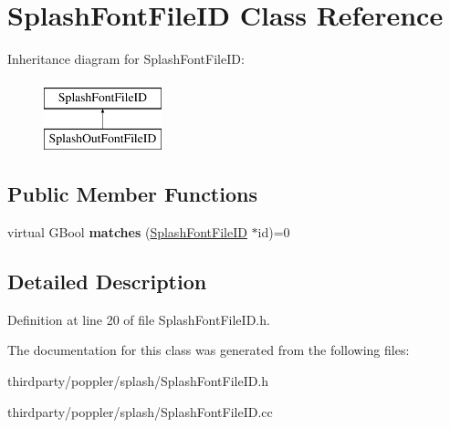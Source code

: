 \hypertarget{class_splash_font_file_i_d}{}\section{Splash\+Font\+File\+ID Class Reference}
\label{class_splash_font_file_i_d}
Inheritance diagram for Splash\+Font\+File\+ID\+:\begin{figure}[H]
\begin{center}
\leavevmode
\includegraphics[height=2.000000cm]{class_splash_font_file_i_d}
\end{center}
\end{figure}
\subsection*{Public Member Functions}
\begin{DoxyCompactItemize}
\item 
\mbox{\label{class_splash_font_file_i_d_a474af2f8808fd11a0132ce65837c12c7}} 
virtual G\+Bool {\bfseries matches} (\hyperlink{class_splash_font_file_i_d}{Splash\+Font\+File\+ID} $\ast$id)=0
\end{DoxyCompactItemize}


\subsection{Detailed Description}


Definition at line 20 of file Splash\+Font\+File\+I\+D.\+h.



The documentation for this class was generated from the following files\+:\begin{DoxyCompactItemize}
\item 
thirdparty/poppler/splash/Splash\+Font\+File\+I\+D.\+h\item 
thirdparty/poppler/splash/Splash\+Font\+File\+I\+D.\+cc\end{DoxyCompactItemize}
